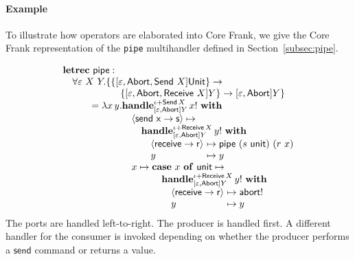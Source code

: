 \documentclass{sigplanconf}
\makeatletter
\newcommand\ba{\begin{array}}
\newcommand\ea{\end{array}}
\newcommand{\bl}{\ba[t]{@{}l@{}}}
\newcommand{\el}{\ea}
\newcommand{\effbox}[1]{[#1]}
\newcommand{\key}[1]{\mathbf{#1}} %
\newcommand{\op}{\mathsf}  %
\newcommand{\con}{\mathsf} %
\newcommand{\inter}{\mathsf} %
\newcommand{\handleSymbol}{\rightarrow}
\newcommand{\handle}[2]{{#1} \handleSymbol {#2}}
\newcommand{\thunk}[1]{\{{#1}\}}
\newcommand{\evd}{\varepsilon}
\newcommand{\effin}[1]{\langle {#1} \rangle}
\newcommand{\id}{\iota}
\makeatother
\begin{document}
\paragraph{Example}
To illustrate how operators are elaborated into Core Frank, we give
the Core Frank representation of the \verb!pipe! multihandler defined
in Section~\ref{subsec:pipe}.

\[
\bl
\key{letrec}~
  \op{pipe} : \\
    \quad \forall \evd~X~Y. \{\bl
              \thunk{\effbox{\evd, \inter{Abort}, \inter{Send}~X}\con{Unit}} \to \\
              \quad \thunk{\effbox{\evd, \inter{Abort}, \inter{Receive}~X}Y} \to
                \effbox{\evd, \inter{Abort}}Y\} \\
              \el \\
\quad\qquad =
  \lambda x\,y.
    \bl
    \key{handle}^{\id + \inter{Send}\,X}_{\effbox{\evd, \inter{Abort}}Y}\,x!~\key{with} \\
       \ba{@{}r@{\quad}l@{}}
       &\op{\effin{\handle{\op{send}~x}{s}}} \mapsto \\
       &\quad
          \bl
          \key{handle}^{\id + \inter{Receive}\,X}_{\effbox{\evd, \inter{Abort}}Y}\,y!~\key{with} \\
            \ba{@{}r@{\quad}l@{~}l@{}}
                     &\op{\effin{\handle{\op{receive}}{r}}} &\mapsto \op{pipe}~(s~\op{unit})~(r~x) \\
            &y                                     &\mapsto y \\
            \ea \\
          \el \\
          &x \mapsto
             \bl
             \key{case}~x~\key{of}~\con{unit} \mapsto \\
             \quad \bl
                   \key{handle}^{\id + \inter{Receive}\,X}_{\effbox{\evd, \inter{Abort}}Y}\,y!~\key{with} \\
                      \ba{@{}r@{\quad}l@{~}l@{}}
                               &\op{\effin{\handle{\op{receive}}{r}}} &\mapsto \op{abort}! \\
                      &y                                     &\mapsto y \\
                      \ea \\
                   \el \\
             \el \\
       \ea \\
   \el \\
\el
\]
The ports are handled left-to-right. The producer is handled first. A
different handler for the consumer is invoked depending on whether the
producer performs a $\op{send}$ command or returns a value.
\end{document}
